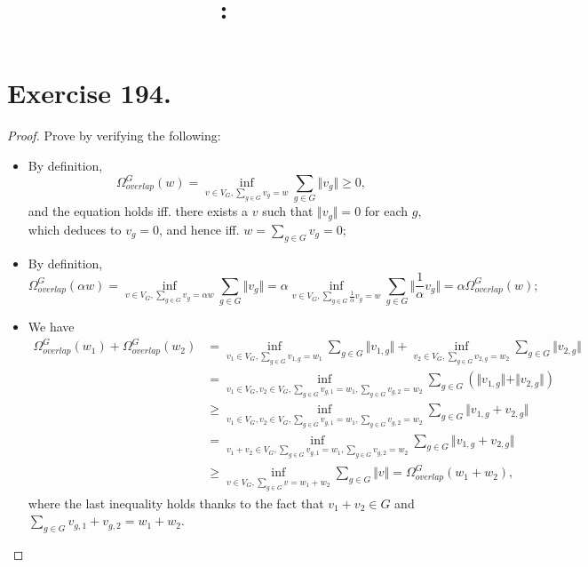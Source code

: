 \documentclass{article}
\date{}
\title{
    \textmd{\textbf{\hmwkClass:\ \hmwkTitle}}\\
}
\author{\hmwkAuthorName}
\begin{document}
\maketitle
\section{Exercise 194.}
\begin{proof}
Prove by verifying the following:
\begin{itemize}
    \item By definition, $$\Omega_{overlap}^{G}(w) = \inf_{v\in V_{G}, \sum_{g\in G}v_g=w}\sum_{g\in G}\Vert v_g \Vert \geq 0,$$ and the equation holds iff. there exists a $v$ such that $\Vert v_g\Vert =0$ for each $g$, which deduces to $v_g = 0$, and hence iff. $w = \sum_{g\in G} v_g   = 0$;
    \item By definition,$$\Omega_{overlap}^{G}(\alpha w) = \inf_{v\in V_{G}, \sum_{g\in G}v_g= \alpha w}\sum_{g\in G}\Vert v_g \Vert = \alpha \inf_{v\in V_{G}, \sum_{g\in G}\frac{1}{\alpha} v_g =  w} \sum_{g\in G} \Vert \frac{1}{\alpha} v_g \Vert = \alpha \Omega_{overlap}^{G}(w);$$
    \item We have
    \begin{align*}
        \Omega_{overlap}^{G}(w_1) + \Omega_{overlap}^{G}(w_2) & = \inf_{v_{1}\in V_{G}, \sum_{g\in G}v_{1,g}=w_1}\sum_{g\in G}\Vert v_{1,g} \Vert + \inf_{v_{2}\in V_{G}, \sum_{g\in G}v_{2,g}=w_2}\sum_{g\in G}\Vert v_{2,g} \Vert \\
        & = \inf_{v_{1}\in V_{G}, v_{2}\in V_{G}, \sum_{g\in G}v_{g,1}=w_1 ,\sum_{g\in G}v_{g,2}=w_2} \sum_{g\in G} (\Vert v_{1,g} \Vert + \Vert v_{2,g} \Vert) \\
        &\geq \inf_{v_{1}\in V_{G}, v_{2}\in V_{G}, \sum_{g\in G}v_{g,1}=w_1 ,\sum_{g\in G}v_{g,2}=w_2} \sum_{g\in G} \Vert v_{1,g} + v_{2,g} \Vert \\
        & = \inf_{v_{1}+v_{2}\in V_{G}, \sum_{g\in G}v_{g,1}=w_1 ,\sum_{g\in G}v_{g,2}=w_2} \sum_{g\in G} \Vert v_{1,g} + v_{2,g} \Vert \\
        &\geq \inf_{v\in V_{G}, \sum_{g\in G}v=w_1+w_2} \sum_{g\in G} \Vert v \Vert = \Omega_{overlap}^{G}(w_1 + w_2),
    \end{align*}
    where the last inequality holds thanks to the fact that $v_{1} + v_{2} \in G $ and $\sum_{g\in G}v_{g,1} + v_{g,2} = w_1 + w_2 $.    
\end{itemize}
\end{proof}
\end{document}
